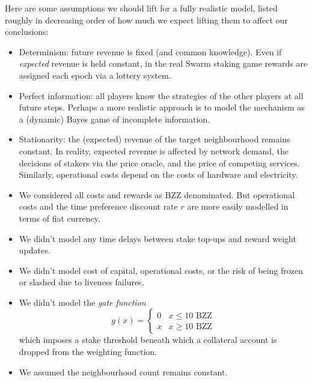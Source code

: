 Here are some assumptions we should lift for a fully realistic model, listed roughly in decreasing order of how much we expect lifting them to affect our conclusions:
\begin{itemize}
  \item Determinism: future revenue is fixed (and common knowledge). Even if \emph{expected} revenue is held constant, in the real Swarm staking game rewards are assigned each epoch via a lottery system.
  \item Perfect information: all players know the strategies of the other players at all future steps. Perhaps a more realistic approach is to model the mechanism as a (dynamic) Bayes game of incomplete information.
  \item Stationarity: the (expected) revenue of the target neighbourhood remains constant. In reality, expected revenue is affected by network demand, the decisions of stakers via the price oracle, and the price of competing services.
  Similarly, operational costs depend on the costs of hardware and electricity.
  \item We considered all costs and rewards as BZZ denominated. But operational costs and the time preference discount rate $r$ are more easily modelled in terms of fiat currency.
  \item We didn't model any time delays between stake top-ups and reward weight updates.
  \item We didn't model cost of capital, operational costs, or the risk of being frozen or slashed due to liveness failures.
  \item We didn't model the \emph{gate function} 
  \[
    g(x) = \left\{\begin{array}{ll}0 & x\leq 10\text{ BZZ} \\ x & x \geq 10\text{ BZZ} \end{array}\right.
  \]
  which imposes a stake threshold beneath which a collateral account is dropped from the weighting function.
  \item We assumed the neighbourhood count remains constant.
\end{itemize}